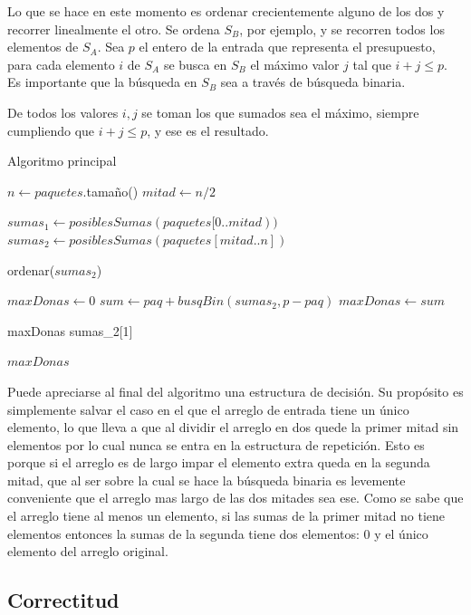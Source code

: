 Lo que se hace en este momento es ordenar crecientemente alguno de los dos y
recorrer linealmente el otro. Se ordena $S_B$, por ejemplo, y se recorren todos
los elementos de $S_A$. Sea $p$ el entero de la entrada que representa el
presupuesto, para cada elemento $i$ de $S_A$ se busca en $S_B$ el máximo valor
$j$ tal que $i + j \leq p$. Es importante que la búsqueda en $S_B$ sea a través
de búsqueda binaria.

De todos los valores $i,j$ se toman los que sumados sea el máximo, siempre
cumpliendo que $i + j \leq p$, y ese es el resultado.

\bigskip

\begin{algorithm}[H]
	\caption{Algoritmo principal}
    $n \gets paquetes$.tamaño() \;
	$mitad \gets n / 2$ \;

	$sumas_1 \gets posiblesSumas(paquetes[0..mitad))$ \;
	$sumas_2 \gets posiblesSumas(paquetes[mitad..n])$ \;

	ordenar($sumas_2$) \;

	$maxDonas \gets 0$ \;
	 {
		 {
			$sum \gets paq + busqBin(sumas_2, p - paq)$ \;
			 {
				$maxDonas \gets sum$ \;
			}
		}
	}

	 {
		maxDonas \gets sumas_2[1] \;
	}

	\Return $maxDonas$ \;
\end{algorithm}

Puede apreciarse al final del algoritmo una estructura de decisión. Su propósito
es simplemente salvar el caso en el que el arreglo de entrada tiene un único
elemento, lo que lleva a que al dividir el arreglo en dos quede la primer mitad
sin elementos por lo cual nunca se entra en la estructura de repetición. Esto es
porque si el arreglo es de largo impar el elemento extra queda en la segunda
mitad, que al ser sobre la cual se hace la búsqueda binaria es levemente
conveniente que el arreglo mas largo de las dos mitades sea ese. Como se sabe
que el arreglo tiene al menos un elemento, si las sumas de la primer mitad no
tiene elementos entonces la sumas de la segunda tiene dos elementos: 0 y el
único elemento del arreglo original.

\subsection{Correctitud}

